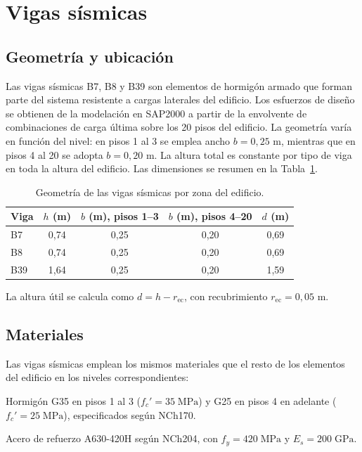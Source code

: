\section{Vigas sísmicas}
 
\subsection{Geometría y ubicación}
 
Las vigas sísmicas B7, B8 y B39 son elementos de hormigón armado que forman parte del sistema
resistente a cargas laterales del edificio. Los esfuerzos de diseño se obtienen de la modelación en
SAP2000 a partir de la envolvente de combinaciones de carga última sobre los 20 pisos del edificio.
La geometría varía en función del nivel: en pisos 1 al 3 se emplea ancho $b = 0{,}25$ m, mientras
que en pisos 4 al 20 se adopta $b = 0{,}20$ m. La altura total es constante por tipo de viga en
toda la altura del edificio. Las dimensiones se resumen en la Tabla~\ref{tab:viga_geometria}.
 
\begin{table}[H]
\centering
\caption{Geometría de las vigas sísmicas por zona del edificio.}
\label{tab:viga_geometria}
\begin{tabular}{lcccc}
\hline
Viga & $h$ (m) & $b$ (m), pisos 1--3 & $b$ (m), pisos 4--20 & $d$ (m) \\
\hline
B7  & 0,74 & 0,25 & 0,20 & 0,69 \\
B8  & 0,74 & 0,25 & 0,20 & 0,69 \\
B39 & 1,64 & 0,25 & 0,20 & 1,59 \\
\hline
\end{tabular}
\end{table}
 
La altura útil se calcula como $d = h - r_\text{ec}$, con recubrimiento $r_\text{ec} = 0{,}05$ m.
 
\subsection{Materiales}
 
Las vigas sísmicas emplean los mismos materiales que el resto de los elementos del edificio en los
niveles correspondientes:
 
Hormigón G35 en pisos 1 al 3 ($f_c' = 35\;\text{MPa}$) y G25 en pisos 4 en adelante ($f_c' = 25\;\text{MPa}$), especificados según NCh170.
 
Acero de refuerzo A630-420H según NCh204, con $f_y = 420\;\text{MPa}$ y $E_s = 200\;\text{GPa}$.
 
